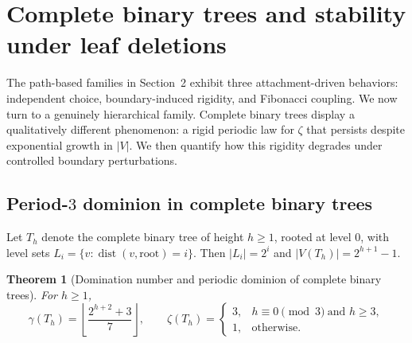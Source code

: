 \documentclass[11pt]{article}
\newtheorem{theorem}{Theorem}
\theoremstyle{definition}
\theoremstyle{remark}
\newcommand{\zet}{\zeta}
\begin{document}
\section{Complete binary trees and stability under leaf deletions}\label{sec:binary}
The path-based families in Section~2 exhibit three attachment-driven behaviors:
independent choice, boundary-induced rigidity, and Fibonacci coupling.
We now turn to a genuinely hierarchical family.
Complete binary trees display a qualitatively different phenomenon:
a rigid periodic law for $\zet$ that persists despite exponential growth in $|V|$.
We then quantify how this rigidity degrades under controlled boundary perturbations.

\subsection{Period-$3$ dominion in complete binary trees}
Let $T_h$ denote the complete binary tree of height $h\ge 1$, rooted at level $0$, with level sets
$L_i=\{v:\operatorname{dist}(v,\text{root})=i\}$. Then $|L_i|=2^i$ and $|V(T_h)|=2^{h+1}-1$.

\begin{theorem}[Domination number and periodic dominion of complete binary trees]\label{thm:binary}
For $h\ge 1$,
\[
\gamma(T_h)=\left\lfloor\frac{2^{h+2}+3}{7}\right\rfloor,
\qquad
\zeta(T_h)=
\begin{cases}
3, & h\equiv 0 \pmod{3}\ \text{and } h\ge 3,\\
1, & \text{otherwise}.
\end{cases}
\]
\end{theorem}
\end{document}
